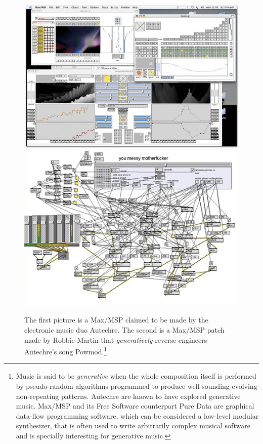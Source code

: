 \begin{figure}
  \begin{minipage}{\textwidth}
    \centering
    \includegraphics[width=.7\textwidth]{pic/autechre-2.jpg}
    \includegraphics[width=.7\textwidth]{pic/autechre-1.jpg}
    \caption[Autechre related Max/MSP patches]{The first picture is a
      Max/MSP claimed to be made by the electronic music duo
      Autechre\cite{autechrepatch}. The second is a Max/MSP patch made
      by Robbie Martin that \emph{generatively} reverse-engineers Autechre's
      song Powmod.\footnote{Music is said to be \emph{generative} when the whole
        composition itself is performed by pseudo-random algorithms
        programmed to produce well-sounding evolving non-repeating
        patterns. Autechre are known to have explored generative
        music. Max/MSP and its Free Software counterpart Pure Data are
        graphical data-flow programming software, which can be considered
        a low-level modular synthesizer, that is often used to write
        arbitrarily complex musical software and is specially interesting
        for generative music.}}
  \end{minipage}
  \label{fig:autechre}
\end{figure}

